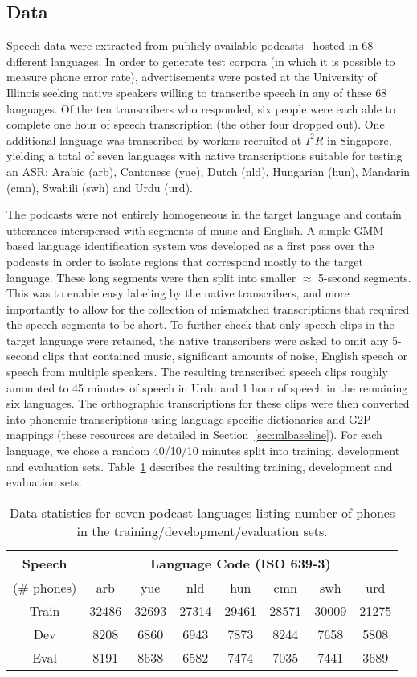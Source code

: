 \subsection{Data}
\label{sec:data}

Speech data were extracted from publicly available podcasts~\cite{SBS}
hosted in 68 different languages.  In order to generate test corpora
(in which it is possible to measure phone error rate), advertisements
were posted at the University of Illinois seeking native speakers
willing to transcribe speech in any of these 68 languages.  Of the ten
transcribers who responded, six people were each able to complete one
hour of speech transcription (the other four dropped out).  One
additional language was transcribed by workers recruited at $I^2R$ in
Singapore, yielding a total of seven languages with native
transcriptions suitable for testing an ASR: Arabic (arb), Cantonese
(yue), Dutch (nld), Hungarian (hun), Mandarin (cmn), Swahili (swh) and
Urdu (urd).

The podcasts were not entirely homogeneous in the target
language and contain utterances interspersed with segments of music
and English. A simple GMM-based language identification system was
developed as a first pass over the podcasts in order to isolate
regions that correspond mostly to the target language. These long
segments were then split into smaller $\approx$ 5-second
segments. This was to enable easy labeling by the native transcribers,
and more importantly to allow for the collection of mismatched
transcriptions that required the speech segments to be short. To
further check that only speech clips in the target language were
retained, the native transcribers were asked to omit any 5-second
clips that contained music, significant amounts of noise, English
speech or speech from multiple speakers. The resulting transcribed
speech clips roughly amounted to 45 minutes of speech in Urdu and 1
hour of speech in the remaining six languages. The orthographic
transcriptions for these clips were then converted into phonemic
transcriptions using language-specific dictionaries and G2P mappings
(these resources are detailed in Section~\ref{sec:mlbaseline}). For
each language, we chose a random 40/10/10 minutes split into training,
development and evaluation sets.  Table~\ref{tab:data} describes the
resulting training, development and evaluation sets.
\begin{table}[t]
\centering
\begin{tabular}{|c||c|c|c|c|c|c|c|}\hline
Speech  & \multicolumn{7}{|c|}{Language Code (ISO 639-3)}\\\hline
(\# phones) & arb & yue & nld & hun & cmn & swh & urd \\ \hline\hline
Train & 32486 & 32693 & 27314 & 29461 & 28571 & 30009 & 21275 \\
Dev & 8208 & 6860 & 6943 & 7873 & 8244 & 7658 & 5808 \\
Eval & 8191 & 8638 & 6582 & 7474 & 7035 & 7441 & 3689 \\\hline
\end{tabular}
\caption{Data statistics for seven podcast languages listing number of phones in the training/development/evaluation sets.}
\label{tab:data}
\end{table}
